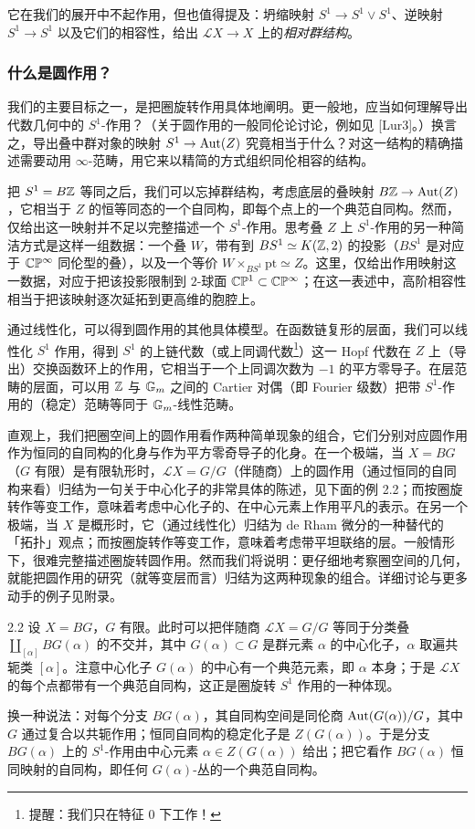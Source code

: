 它在我们的展开中不起作用，但也值得提及：坍缩映射 $S^1\to S^1\vee S^1$、逆映射 $S^1\to S^1$ 以及它们的相容性，给出 $\mathcal L X\to X$ 上的\emph{相对群结构}。

\subsubsection{什么是圆作用？}

我们的主要目标之一，是把圈旋转作用具体地阐明。更一般地，应当如何理解导出代数几何中的 $S^1$-作用？（关于圆作用的一般同伦论讨论，例如见 [Lur3]。）换言之，导出叠中群对象的映射 $S^1\to\operatorname{Aut}(Z)$ 究竟相当于什么？对这一结构的精确描述需要动用 $\infty$-范畴，用它来以精简的方式组织同伦相容的结构。

把 $S^1=B\mathbb{Z}$ 等同之后，我们可以忘掉群结构，考虑底层的叠映射 $B\mathbb{Z}\to\operatorname{Aut}(Z)$，它相当于 $Z$ 的恒等同态的一个自同构，即每个点上的一个典范自同构。然而，仅给出这一映射并不足以完整描述一个 $S^1$-作用。思考叠 $Z$ 上 $S^1$-作用的另一种简洁方式是这样一组数据：一个叠 $W$，带有到 $BS^1\simeq K(\mathbb{Z},2)$ 的投影（$BS^1$ 是对应于 $\mathbb{C}\mathbb{P}^\infty$ 同伦型的叠），以及一个等价 $W\times_{BS^1}\mathrm{pt}\simeq Z$。这里，仅给出作用映射这一数据，对应于把该投影限制到 $2$-球面 $\mathbb{C}\mathbb{P}^1\subset\mathbb{C}\mathbb{P}^\infty$；在这一表述中，高阶相容性相当于把该映射逐次延拓到更高维的胞腔上。

通过线性化，可以得到圆作用的其他具体模型。在函数链复形的层面，我们可以线性化 $S^1$ 作用，得到 $S^1$ 的上链代数（或上同调代数\footnote{提醒：我们只在特征 $0$ 下工作！}）这一 Hopf 代数在 $Z$ 上（导出）交换函数环上的作用，它相当于一个上同调次数为 $-1$ 的平方零导子。在层范畴的层面，可以用 $\mathbb{Z}$ 与 $\mathbb{G}_m$ 之间的 Cartier 对偶（即 Fourier 级数）把带 $S^1$-作用的（稳定）范畴等同于 $\mathbb{G}_m$-线性范畴。

直观上，我们把圈空间上的圆作用看作两种简单现象的组合，它们分别对应圆作用作为恒同的自同构的化身与作为平方零奇导子的化身。在一个极端，当 $X=BG$（$G$ 有限）是有限轨形时，$\mathcal L X=G/G$（伴随商）上的圆作用（通过恒同的自同构来看）归结为一句关于中心化子的非常具体的陈述，见下面的例 2.2；而按圈旋转作等变工作，意味着考虑中心化子的、在中心元素上作用平凡的表示。在另一个极端，当 $X$ 是概形时，它（通过线性化）归结为 de Rham 微分的一种替代的「拓扑」观点；而按圈旋转作等变工作，意味着考虑带平坦联络的层。一般情形下，很难完整描述圈旋转圆作用。然而我们将说明：更仔细地考察圈空间的几何，就能把圆作用的研究（就等变层而言）归结为这两种现象的组合。详细讨论与更多动手的例子见附录。

\begin{exam}{2.2}\label{exam:a5-01-2}
设 $X=BG$，$G$ 有限。此时可以把伴随商 $\mathcal L X=G/G$ 等同于分类叠 $\coprod_{[\alpha]}BG(\alpha)$ 的不交并，其中 $G(\alpha)\subset G$ 是群元素 $\alpha$ 的中心化子，$\alpha$ 取遍共轭类 $[\alpha]$。注意中心化子 $G(\alpha)$ 的中心有一个典范元素，即 $\alpha$ 本身；于是 $\mathcal L X$ 的每个点都带有一个典范自同构，这正是圈旋转 $S^1$ 作用的一种体现。

换一种说法：对每个分支 $BG(\alpha)$，其自同构空间是同伦商 $\operatorname{Aut}(G(\alpha))/G$，其中 $G$ 通过复合以共轭作用；恒同自同构的稳定化子是 $Z(G(\alpha))$。于是分支 $BG(\alpha)$ 上的 $S^1$-作用由中心元素 $\alpha\in Z(G(\alpha))$ 给出；把它看作 $BG(\alpha)$ 恒同映射的自同构，即任何 $G(\alpha)$-丛的一个典范自同构。
\end{exam}

